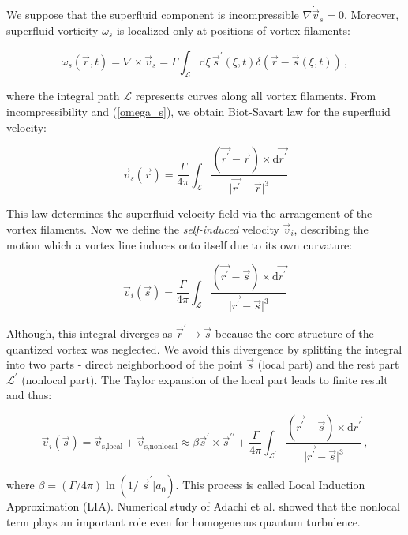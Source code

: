 We suppose that the superfluid component is incompressible $\nabla \dot \vec{v}_s = 0$. Moreover, superfluid vorticity $\omega_s$ is localized only at positions of vortex filaments:

\begin{equation}
\omega_s(\vec{r},t) = \nabla \times \vec{v}_s
= \Gamma \int_{\mathcal{L}} \text{d}\xi \, \vec{s}^{\prime}(\xi, t) \delta (\vec{r} - \vec{s}(\xi,t))\,,
\label{omega_s}
\end{equation}

where the integral path $\mathcal{L}$ represents curves along all vortex filaments. From incompressibility and (\ref{omega_s}), we obtain Biot-Savart law for the superfluid velocity:

\begin{equation}
\vec{v}_s(\vec{r}) = \frac{\Gamma}{4\pi} \int_{\mathcal{L}} \frac{(\vec{r^{\prime}} - \vec{r}) \times \text{d}\vec{r^{\prime}}}{\vert \vec{r^{\prime}} - \vec{r} \vert^3}
\end{equation}

This law determines the superfluid velocity field via the arrangement of the vortex
filaments. Now we define the \textit{self-induced} velocity $\vec{v}_i$, describing the motion which a vortex line induces onto itself due to its own curvature:

\begin{equation}
\vec{v}_i(\vec{s}) = \frac{\Gamma}{4\pi} \int_{\mathcal{L}} \frac{(\vec{r^{\prime}} - \vec{s}) \times \text{d}\vec{r^{\prime}}}{\vert \vec{r^{\prime}} - \vec{s} \vert^3}
\end{equation}

Although, this integral diverges as $\vec{r}^{\prime} \rightarrow \vec{s}$ because the core structure
of the quantized vortex was neglected. We avoid this divergence by splitting the integral into two parts - direct neighborhood of the point $\vec{s}$ (local part) and the rest part $\mathcal{L}^{\prime}$ (nonlocal part). The Taylor expansion of the local part leads to finite result and thus:

\begin{equation}
\vec{v}_i(\vec{s})
= \vec{v}_{\text{s,local}} + \vec{v}_{\text{s,nonlocal}}
\approx \beta \vec{s}^{\prime} \times \vec{s}^{\prime \prime} + \frac{\Gamma}{4\pi} \int_{\mathcal{L}^{\prime}} \frac{(\vec{r^{\prime}} - \vec{s}) \times \text{d}\vec{r^{\prime}}}{\vert \vec{r^{\prime}} - \vec{s} \vert^3}\,,
\end{equation}

where $\beta = (\Gamma / 4\pi) \ln(1/\vert\vec{s}^{\prime}\vert a_0)$. This process is called Local Induction Approximation (LIA). Numerical study of Adachi et al. showed that the nonlocal term plays an important role even for homogeneous quantum turbulence.

